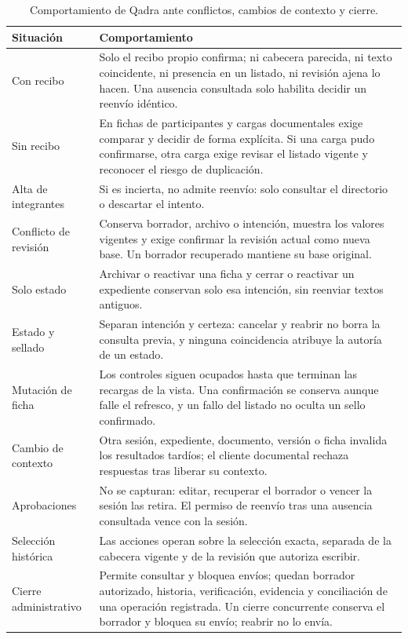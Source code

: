 \begin{table}[!t]
  \centering
  \caption{Comportamiento de Qadra ante conflictos, cambios de contexto y cierre.}
  \label{tab:impl-qadra-conciliacion}
  
  \begin{tabularx}{\linewidth}{@{}L{2.9cm} X@{}}
    \toprule
    \textbf{Situación} & \textbf{Comportamiento} \\
    \midrule
    Con recibo & Solo el recibo propio confirma; ni cabecera parecida, ni texto coincidente, ni presencia en un listado, ni revisión ajena lo hacen. Una ausencia consultada solo habilita decidir un reenvío idéntico. \\
    Sin recibo & En fichas de participantes y cargas documentales exige comparar y decidir de forma explícita. Si una carga pudo confirmarse, otra carga exige revisar el listado vigente y reconocer el riesgo de duplicación. \\
    Alta de integrantes & Si es incierta, no admite reenvío: solo consultar el directorio o descartar el intento. \\
    Conflicto de revisión & Conserva borrador, archivo o intención, muestra los valores vigentes y exige confirmar la revisión actual como nueva base. Un borrador recuperado mantiene su base original. \\
    Solo estado & Archivar o reactivar una ficha y cerrar o reactivar un expediente conservan solo esa intención, sin reenviar textos antiguos. \\
    Estado y sellado & Separan intención y certeza: cancelar y reabrir no borra la consulta previa, y ninguna coincidencia atribuye la autoría de un estado. \\
    Mutación de ficha & Los controles siguen ocupados hasta que terminan las recargas de la vista. Una confirmación se conserva aunque falle el refresco, y un fallo del listado no oculta un sello confirmado. \\
    Cambio de contexto & Otra sesión, expediente, documento, versión o ficha invalida los resultados tardíos; el cliente documental rechaza respuestas tras liberar su contexto. \\
    Aprobaciones & No se capturan: editar, recuperar el borrador o vencer la sesión las retira. El permiso de reenvío tras una ausencia consultada vence con la sesión. \\
    Selección histórica & Las acciones operan sobre la selección exacta, separada de la cabecera vigente y de la revisión que autoriza escribir. \\
    Cierre administrativo & Permite consultar y bloquea envíos; quedan borrador autorizado, historia, verificación, evidencia y conciliación de una operación registrada. Un cierre concurrente conserva el borrador y bloquea su envío; reabrir no lo envía. \\
    \bottomrule
  \end{tabularx}
\end{table}

